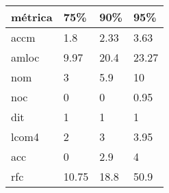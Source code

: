 \begin{tabular}{|l|l|l|l|}
\hline
métrica&75\%&90\%&95\%\\
\hline
accm&1.8&2.33&3.63\\
\hline
amloc&9.97&20.4&23.27\\
\hline
nom&3&5.9&10\\
\hline
noc&0&0&0.95\\
\hline
dit&1&1&1\\
\hline
lcom4&2&3&3.95\\
\hline
acc&0&2.9&4\\
\hline
rfc&10.75&18.8&50.9\\
\hline
\end{tabular}
